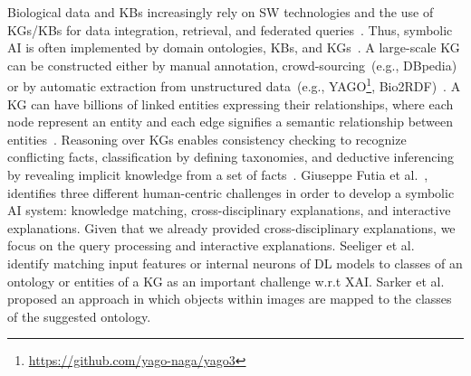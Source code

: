 \hspace*{3.5mm} Biological data and KBs increasingly rely on SW technologies and the use of KGs/KBs for data integration, retrieval, and federated queries~\cite{alshahrani2017neuro}. Thus, symbolic AI is often implemented by domain ontologies, KBs, and KGs~\cite{futia2020integration}. A large-scale KG can be constructed either by manual annotation, crowd-sourcing~(e.g., DBpedia) or by automatic extraction from unstructured data~(e.g., YAGO\footnote{\url{https://github.com/yago-naga/yago3}}, Bio2RDF)~\cite{wang2015explicit}. A KG can have billions of linked entities expressing their relationships, where each node represent an entity and each edge signifies a semantic relationship between entities~\cite{karim2019drug}. Reasoning over KGs enables consistency checking to recognize conflicting facts, classification by defining taxonomies, and deductive inferencing by revealing implicit knowledge from a set of facts~\cite{futia2020integration}. Giuseppe Futia et al.~\cite{futia2020integration}, identifies three different human-centric challenges in order to develop a symbolic AI system: knowledge matching, cross-disciplinary explanations, and interactive explanations. Given that we already provided cross-disciplinary explanations, we focus on the query processing and interactive explanations. Seeliger et al.~\cite{seeliger2019semantic} identify matching input features or internal neurons of DL models to classes of an ontology or entities of a KG as an important challenge w.r.t XAI. Sarker et al.~\cite{sarker2017explaining} proposed an approach in which objects within images are mapped to the classes of the suggested ontology. 

